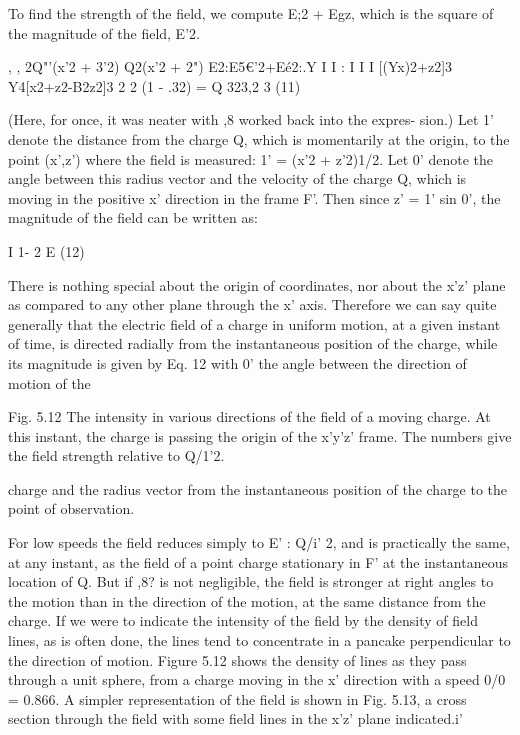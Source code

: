 To find the strength of the field, we compute E;2 + Egz, which is
the square of the magnitude of the field, E'2.

\begin{equation}
\end{equation}
, , 2Q"'(x'2 + 3'2) Q2(x'2 + 2")
E2:E5€'2+Eé2:.Y I I : I I I
[(Yx)2+z2]3 Y4[x2+z2-B2z2]3
2 2
(1 - .32)
= Q 323,2 3 (11)

(Here, for once, it was neater with ,8 worked back into the expres-
sion.) Let 1' denote the distance from the charge Q, which is
momentarily at the origin, to the point (x',z') where the field is
measured: 1' = (x'2 + z'2)1/2. Let 0' denote the angle between this
radius vector and the velocity of the charge Q, which is moving in
the positive x' direction in the frame F'. Then since z' = 1' sin 0', the
magnitude of the field can be written as:

\begin{equation}
\end{equation}
I 1- 2
E  (12)

There is nothing special about the origin of coordinates, nor about
the x'z' plane as compared to any other plane through the x' axis.
Therefore we can say quite generally that the electric field of a charge
in uniform motion, at a given instant of time, is directed radially from
the instantaneous position of the charge, while its magnitude is given
by Eq. 12 with 0' the angle between the direction of motion of the

 

Fig. 5.12 The intensity in various directions
of the field of a moving charge. At
this instant, the charge is passing the origin
of the x'y'z' frame. The numbers give the
field strength relative to Q/1'2.

charge and the radius vector from the instantaneous position of the
charge to the point of observation.

For low speeds the field reduces simply to E' : Q/i' 2, and is practically
the same, at any instant, as the field of a point charge stationary
in F' at the instantaneous location of Q. But if ,8? is not
negligible, the field is stronger at right angles to the motion than in
the direction of the motion, at the same distance from the charge.
If we were to indicate the intensity of the field by the density of field
lines, as is often done, the lines tend to concentrate in a pancake
perpendicular to the direction of motion. Figure 5.12 shows the
density of lines as they pass through a unit sphere, from a charge
moving in the x' direction with a speed 0/0 = 0.866. A simpler representation
of the field is shown in Fig. 5.13, a cross section through
the field with some field lines in the x'z' plane indicated.i'

